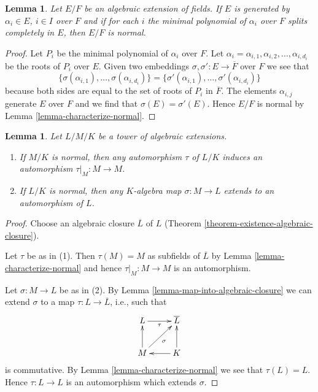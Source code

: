 \documentclass{stacks-project}
\theoremstyle{plain}
\newtheorem{lemma}[subsection]{Lemma}
\theoremstyle{definition}
\theoremstyle{remark}
\numberwithin{equation}{subsection}
\begin{document}
\begin{lemma}
\label{lemma-normally-generated}
Let $E/F$ be an algebraic extension of fields.
If $E$ is generated by $\alpha_i \in E$, $i \in I$
over $F$ and if for each $i$ the minimal polynomial
of $\alpha_i$ over $F$ splits completely in $E$, then
$E/F$ is normal.
\end{lemma}

\begin{proof}
Let $P_i$ be the minimal polynomial of $\alpha_i$ over $F$.
Let $\alpha_i = \alpha_{i, 1}, \alpha_{i, 2}, \ldots, \alpha_{i, d_i}$
be the roots of $P_i$ over $E$. Given two embeddings
$\sigma, \sigma' : E \to \overline{F}$ over $F$ we see that
$$
\{\sigma(\alpha_{i, 1}), \ldots, \sigma(\alpha_{i, d_i})\} =
\{\sigma'(\alpha_{i, 1}), \ldots, \sigma'(\alpha_{i, d_i})\}
$$
because both sides are equal to the set of roots of $P_i$
in $\overline{F}$. The elements $\alpha_{i, j}$
generate $E$ over $F$ and we find that $\sigma(E) = \sigma'(E)$.
Hence $E/F$ is normal by Lemma \ref{lemma-characterize-normal}.
\end{proof}

\begin{lemma}
\label{lemma-lift-maps}
Let $L/M/K$ be a tower of algebraic extensions.
\begin{enumerate}
\item If $M/K$ is normal, then any automorphism $\tau$ of $L/K$
induces an automorphism $\tau|_M : M \to M$.
\item If $L/K$ is normal, then any $K$-algebra map $\sigma : M \to L$
extends to an automorphism of $L$.
\end{enumerate}
\end{lemma}

\begin{proof}
Choose an algebraic closure $\overline{L}$ of $L$
(Theorem \ref{theorem-existence-algebraic-closure}).

\medskip\noindent
Let $\tau$ be as in (1). Then $\tau(M) = M$ as subfields of $\overline{L}$
by Lemma \ref{lemma-characterize-normal} and hence
$\tau|_M : M \to M$ is an automorphism.

\medskip\noindent
Let $\sigma : M \to L$ be as in (2).
By Lemma \ref{lemma-map-into-algebraic-closure}
we can extend $\sigma$ to a map
$\tau : L \to \overline{L}$, i.e., such that
$$
\xymatrix{
L \ar[r]_\tau & \overline{L} \\
M \ar[u] \ar[ru]_\sigma & K \ar[l] \ar[u]
}
$$
is commutative. By Lemma \ref{lemma-characterize-normal} we see that
$\tau(L) = L$. Hence $\tau : L \to L$ is an automorphism which
extends $\sigma$.
\end{proof}
\end{document}
